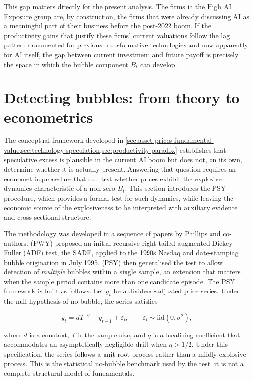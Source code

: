 This gap matters directly for the present analysis. The firms in the High AI Exposure group are, by construction, the firms that were already discussing AI as a meaningful part of their business before the post-2022 boom. If the productivity gains that justify these firms' current valuations follow the lag pattern documented for previous transformative technologies and now apparently for AI itself, the gap between current investment and future payoff is precisely the space in which the bubble component $B_t$ can develop.

\section{Detecting bubbles: from theory to econometrics}
\label{sec:detecting-bubbles}

The conceptual framework developed in \cref{sec:asset-prices-fundamental-value,sec:technology-speculation,sec:productivity-paradox} establishes that speculative excess is plausible in the current AI boom but does not, on its own, determine whether it is actually present. Answering that question requires an econometric procedure that can test whether prices exhibit the explosive dynamics characteristic of a non-zero $B_t$. This section introduces the PSY procedure, which provides a formal test for such dynamics, while leaving the economic source of the explosiveness to be interpreted with auxiliary evidence and cross-sectional structure.

The methodology was developed in a sequence of papers by Phillips and co-authors. \citet{phillipsWuYu2011} (PWY) proposed an initial recursive right-tailed augmented Dickey--Fuller (ADF) test, the SADF, applied to the 1990s Nasdaq and date-stamping bubble origination in July 1995. \citet{phillipsShiYu2015a,phillipsShiYu2015b} (PSY) then generalised the test to allow detection of \emph{multiple} bubbles within a single sample, an extension that matters when the sample period contains more than one candidate episode. The PSY framework is built as follows. Let $y_t$ be a dividend-adjusted price series. Under the null hypothesis of no bubble, the series satisfies

\begin{equation}
y_t = dT^{-\eta} + y_{t-1} + \varepsilon_t, \qquad \varepsilon_t \sim \text{iid}(0, \sigma^2),
\label{eq:psy-null}
\end{equation}

\noindent where $d$ is a constant, $T$ is the sample size, and $\eta$ is a localising coefficient that accommodates an asymptotically negligible drift when $\eta > 1/2$. Under this specification, the series follows a unit-root process rather than a mildly explosive process. This is the statistical no-bubble benchmark used by the test; it is not a complete structural model of fundamentals.

